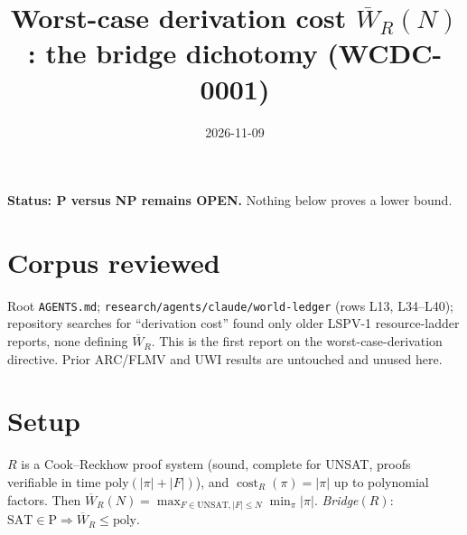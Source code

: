 \documentclass{article}
\title{Worst-case derivation cost $\overline W_R(N)$: the bridge dichotomy (WCDC-0001)}
\date{2026-11-09}
\begin{document}
\maketitle
\noindent\textbf{Status: P versus NP remains OPEN.} Nothing below proves a lower bound.

\section*{Corpus reviewed}
Root \texttt{AGENTS.md}; \texttt{research/agents/claude/world-ledger} (rows L13, L34--L40); repository searches for ``derivation cost'' found only older LSPV-1 resource-ladder reports, none defining $\overline W_R$. This is the first report on the worst-case-derivation directive. Prior ARC/FLMV and UWI results are untouched and unused here.

\section*{Setup}
$R$ is a Cook--Reckhow proof system (sound, complete for UNSAT, proofs verifiable in time poly$(|\pi|+|F|)$), and $\operatorname{cost}_R(\pi)=|\pi|$ up to polynomial factors. Then
$\overline W_R(N)=\max_{F\in\mathrm{UNSAT},|F|\le N}\min_{\pi}|\pi|$.
\emph{Bridge}$(R)$: $\mathrm{SAT}\in\mathrm P\Rightarrow \overline W_R\le\mathrm{poly}$.
\end{document}
